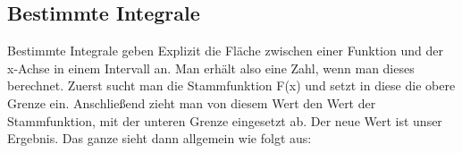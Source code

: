 \subsection{Bestimmte Integrale}
	Bestimmte Integrale geben Explizit die Fläche zwischen einer Funktion und der
	x-Achse in einem Intervall an. Man erhält also eine Zahl, wenn man dieses
	berechnet. Zuerst sucht man die Stammfunktion F(x) und setzt in diese die obere
	Grenze ein. Anschließend zieht man von diesem Wert den Wert der Stammfunktion,
	mit der unteren Grenze eingesetzt ab. Der neue Wert ist unser Ergebnis. Das
	ganze sieht dann allgemein wie folgt aus:
	\formel{\[\int\limits_a^b f(x) \ dx=F(b)-F(a)\]}
	
